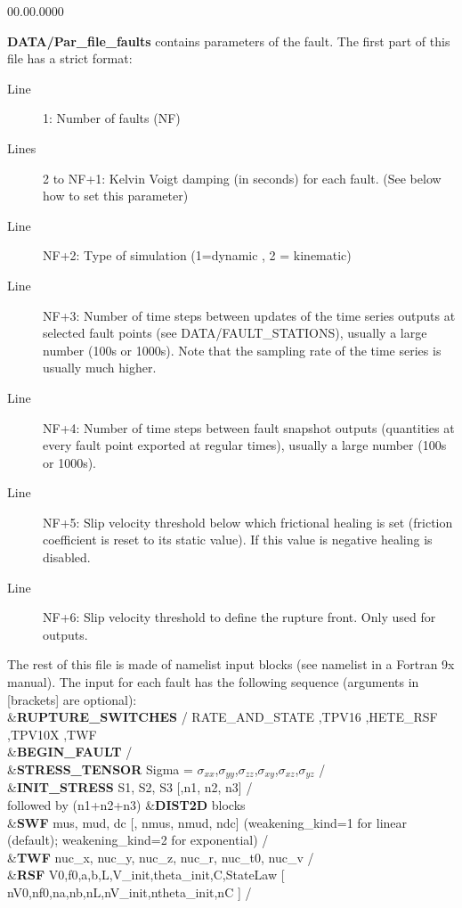 \begin{lyxlist}{00.00.0000}
\item [{\textbf{DATA/Par\_file\_faults}}] contains parameters of the fault.
The first part of this file has a strict format:

\begin{description}
\item [{Line}] 1: Number of faults (NF)
\item [{Lines}] 2 to NF+1: Kelvin Voigt damping (in seconds) for each fault.
(See below how to set this parameter)
\item [{Line}] NF+2: Type of simulation (1=dynamic , 2 = kinematic)
\item [{Line}] NF+3: Number of time steps between updates of the time series
outputs at selected fault points (see DATA/FAULT\_STATIONS), usually
a large number (100s or 1000s). Note that the sampling rate of the
time series is usually much higher.
\item [{Line}] NF+4: Number of time steps between fault snapshot outputs
(quantities at every fault point exported at regular times), usually
a large number (100s or 1000s).
\item [{Line}] NF+5: Slip velocity threshold below which frictional healing
is set (friction coefficient is reset to its static value). If this
value is negative healing is disabled.
\item [{Line}] NF+6: Slip velocity threshold to define the rupture front.
Only used for outputs.
\end{description}

The rest of this file is made of namelist input blocks (see \textquotedbl{}namelist\textquotedbl{}
in a Fortran 9x manual). The input for each fault has the following
sequence (arguments in {[}brackets{]} are optional):\\


\&\textbf{RUPTURE\_SWITCHES}  / RATE\_AND\_STATE ,TPV16 ,HETE\_RSF ,TPV10X ,TWF\\
\&\textbf{BEGIN\_FAULT} /\\
\&\textbf{STRESS\_TENSOR} Sigma = $\sigma_{xx}$,$\sigma_{yy}$,$\sigma_{zz}$,$\sigma_{xy}$,$\sigma_{xz}$,$\sigma_{yz}$ /\\
\&\textbf{INIT\_STRESS} S1, S2, S3 {[},n1, n2, n3{]} /\\


followed by (n1+n2+n3) \&\textbf{DIST2D} blocks\\


\&\textbf{SWF} mus, mud, dc {[}, nmus, nmud, ndc{]} (weakening\_kind=1 for linear (default); weakening\_kind=2 for exponential) /\\
\&\textbf{TWF} nuc\_x, nuc\_y, nuc\_z, nuc\_r, nuc\_t0, nuc\_v /\\
\&\textbf{RSF} V0,f0,a,b,L,V\_init,theta\_init,C,StateLaw {[} nV0,nf0,na,nb,nL,nV\_init,ntheta\_init,nC {]} /\\



\end{lyxlist}
